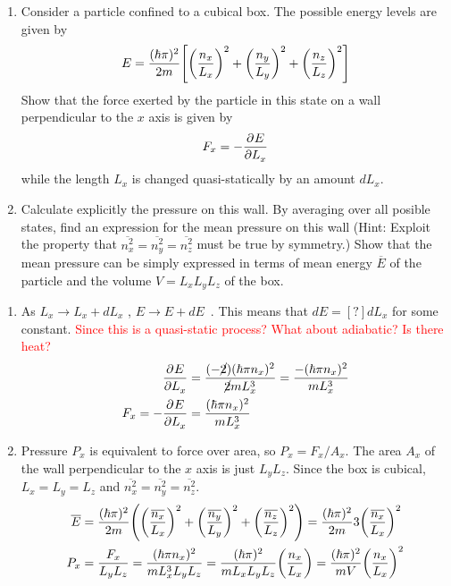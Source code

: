 \documentclass{article}
\begin{document}
    \begin{problem}[Reif 2.7]
        \begin{enumerate}[label=(\alph*)]
            \item Consider a particle confined to a cubical box. The possible energy levels are given by $$E=\frac{(\hbar \pi)^2}{2m}\qty[\qty(\frac{n_x}{L_x})^2+ \qty(\frac{n_y}{L_y})^2+ \qty(\frac{n_z}{L_z})^2]$$ Show that the force exerted by the particle in this state on a wall perpendicular to the $x$ axis is given by $$F_x=-\pder{E}{L_x}$$ while the length $L_x$ is changed quasi-statically by an amount $d L_x$.
            \item Calculate explicitly the pressure on this wall. By averaging over all posible states, find an expression for the mean pressure on this wall (Hint: Exploit the property that $\overline{n_x^2}=\overline{n_y^2}=\overline{n_z^2}$ must be true by symmetry.) Show that the mean pressure can be simply expressed in terms of mean energy $\overline{E}$ of the particle and the volume $V=L_xL_yL_z$ of the box.  
        \end{enumerate}
        \answerline
        \begin{enumerate}[label=\alph*)]
            \item As $\boxed{L_x\rightarrow L_x+dL_x}$ , $\boxed{E\rightarrow E+dE}$~. This means that $dE=[?]dL_x$ for some constant. \textcolor{red}{Since this is a quasi-static process? What about adiabatic? Is there heat?}  
            \begin{align*}
                \pder{E}{L_x}&=\frac{(-\cancel{2})(\hbar\pi n_x)^2}{\cancel{2}mL_x^3}=\frac{-(\hbar\pi n_x)^2}{mL_x^3}
                \\
                F_x=-\pder{E}{L_x}&=\frac{(\hbar\pi n_x)^2}{mL_x^3}
            \end{align*}
            \item Pressure $P_x$ is equivalent to force over area, so $P_x=F_x/A_x$. The area $A_x$ of the wall perpendicular to the $x$ axis is just $L_yL_z$. Since the box is cubical, $L_x=L_y=L_z$ and $\overline{n_x^2}=\overline{n_y^2}=\overline{n_z^2}$.
            \begin{align*}
                \overline{E}&=\frac{(\hbar\pi)^2}{2m}\qty(\qty(\frac{\overline{n_x}}{L_x})^2+\qty(\frac{\overline{n_y}}{L_y})^2+\qty(\frac{\overline{n_z}}{L_z})^2)=\frac{(\hbar\pi)^2}{2m}3\qty(\frac{\overline{n_x}}{L_x})^2
                \\
                P_x&=\frac{F_x}{L_yL_z}=\frac{(\hbar\pi n_x)^2}{mL_x^3L_yL_z}=\frac{(\hbar\pi)^2}{mL_xL_yL_z}\qty(\frac{n_x}{L_x})=\frac{(\hbar\pi)^2}{mV}\qty(\frac{n_x}{L_x})^2

\end{align*}
\end{enumerate}
\end{problem}
\end{document}

